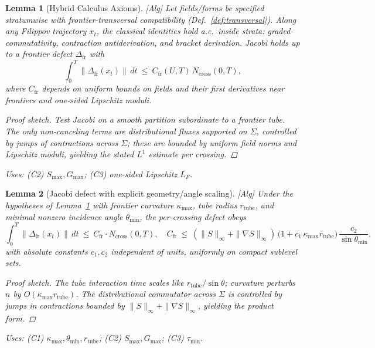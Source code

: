 \documentclass[10pt]{article}
\newcommand{\uses}[1]{\par\smallskip\noindent\textit{Uses: }#1\par\smallskip}
\newenvironment{proofsketch}{\begin{proof}[Proof sketch]}{\end{proof}}
\newcommand{\absconst}[1]{c_{#1}}   %
\newcommand{\anglesep}{\theta_{\min}}
\newtheorem{lemma}{Lemma}
\begin{document}
\begin{lemma}[Hybrid Calculus Axioms]\label{lem:hybrid-axioms}
\emph{[\textup{Alg}]} Let fields/forms be specified stratumwise with frontier-transversal compatibility (Def.~\ref{def:transversal}). Along any Filippov trajectory $x_t$, the classical identities hold a.e.\ inside strata: graded-commutativity, contraction antiderivation, and bracket derivation. Jacobi holds up to a frontier defect $\Delta_{\mathrm{fr}}$ with
\[
\int_0^T\|\Delta_{\mathrm{fr}}(x_t)\|\,dt \ \le\ C_{\mathrm{fr}}(U,T)\,N_{\mathrm{cross}}(0,T),
\]
where $C_{\mathrm{fr}}$ depends on uniform bounds on fields and their first derivatives near frontiers and one-sided Lipschitz moduli.
\begin{proofsketch}
Test Jacobi on a smooth partition subordinate to a frontier tube. The only non-canceling terms are distributional fluxes supported on $\Sigma$, controlled by jumps of contractions across $\Sigma$; these are bounded by uniform field norms and Lipschitz moduli, yielding the stated $L^1$ estimate per crossing.
\end{proofsketch}
\uses{(C2) $S_{\max},G_{\max}$; (C3) one-sided Lipschitz $L_F$.}
\end{lemma}

\begin{lemma}[Jacobi defect with explicit geometry/angle scaling]\label{lem:jacobi-upgraded}
\emph{[\textup{Alg}]}
Under the hypotheses of Lemma~\ref{lem:hybrid-axioms} with frontier curvature $\kappa_{\max}$, tube radius $r_{\mathrm{tube}}$, and minimal nonzero incidence angle $\anglesep$, the per-crossing defect obeys
\[
\int_0^T\!\|\Delta_{\mathrm{fr}}(x_t)\|\,dt \ \le\ C_{\mathrm{fr}}\cdot N_{\mathrm{cross}}(0,T),\quad
C_{\mathrm{fr}}\ \le\ (\|S\|_\infty+\|\nabla S\|_\infty)\,\Big(1+\absconst{1}\,\kappa_{\max} r_{\mathrm{tube}}\Big)\,\frac{\absconst{2}}{\sin\anglesep}\!,
\]
with absolute constants $\absconst{1},\absconst{2}$ independent of units, uniformly on compact sublevel sets.
\begin{proofsketch}
The tube interaction time scales like $r_{\mathrm{tube}}/\sin\theta$; curvature perturbs $n$ by $O(\kappa_{\max}r_{\mathrm{tube}})$. The distributional commutator across $\Sigma$ is controlled by jumps in contractions bounded by $\|S\|_\infty+\|\nabla S\|_\infty$, yielding the product form. 
\end{proofsketch}
\uses{(C1) $\kappa_{\max},\anglesep,r_{\mathrm{tube}}$; (C2) $S_{\max},G_{\max}$; (C3) $\tau_{\min}$.}
\end{lemma}
\end{document}
